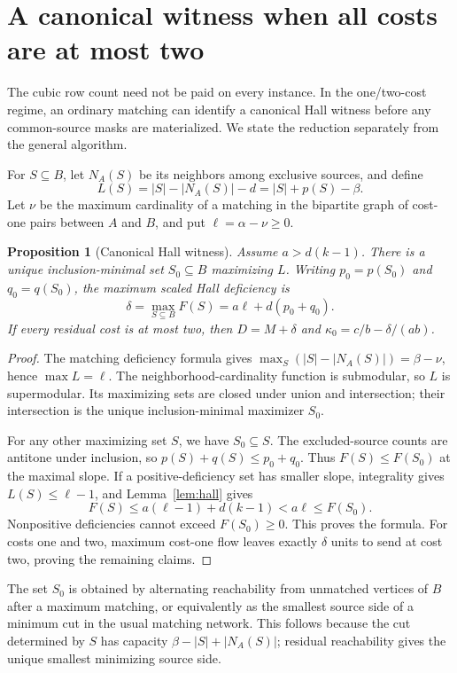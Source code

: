 \documentclass[11pt]{article}
\newtheorem{proposition}[theorem]{Proposition}
\theoremstyle{remark}
\begin{document}
\section{A canonical witness when all costs are at most two}\label{sec:canonical}

The cubic row count need not be paid on every instance. In the one/two-cost regime, an ordinary matching can identify a canonical Hall witness before any common-source masks are materialized. We state the reduction separately from the general algorithm.

For $S\subseteq B$, let $N_A(S)$ be its neighbors among exclusive sources, and define
\[
 L(S)=|S|-|N_A(S)|-d=|S|+p(S)-\beta.
\]
Let $\nu$ be the maximum cardinality of a matching in the bipartite graph of cost-one pairs between $A$ and $B$, and put $\ell=\alpha-\nu\ge0$.

\begin{proposition}[Canonical Hall witness]\label{prop:canonical}
Assume $a>d(k-1)$. There is a unique inclusion-minimal set $S_0\subseteq B$ maximizing $L$. Writing $p_0=p(S_0)$ and $q_0=q(S_0)$, the maximum scaled Hall deficiency is
\[
 \delta=\max_{S\subseteq B}F(S)=a\ell+d(p_0+q_0).
\]
If every residual cost is at most two, then $D=M+\delta$ and $\kappa_0=c/b-\delta/(ab)$.
\end{proposition}
\begin{proof}
The matching deficiency formula gives $\max_S(|S|-|N_A(S)|)=\beta-\nu$, hence $\max L=\ell$. The neighborhood-cardinality function is submodular, so $L$ is supermodular. Its maximizing sets are closed under union and intersection; their intersection is the unique inclusion-minimal maximizer $S_0$.

For any other maximizing set $S$, we have $S_0\subseteq S$. The excluded-source counts are antitone under inclusion, so $p(S)+q(S)\le p_0+q_0$. Thus $F(S)\le F(S_0)$ at the maximal slope. If a positive-deficiency set has smaller slope, integrality gives $L(S)\le\ell-1$, and Lemma~\ref{lem:hall} gives
\[
 F(S)\le a(\ell-1)+d(k-1)<a\ell\le F(S_0).
\]
Nonpositive deficiencies cannot exceed $F(S_0)\ge0$. This proves the formula. For costs one and two, maximum cost-one flow leaves exactly $\delta$ units to send at cost two, proving the remaining claims.
\end{proof}

The set $S_0$ is obtained by alternating reachability from unmatched vertices of $B$ after a maximum matching, or equivalently as the smallest source side of a minimum cut in the usual matching network. This follows because the cut determined by $S$ has capacity $\beta-|S|+|N_A(S)|$; residual reachability gives the unique smallest minimizing source side.
\end{document}
